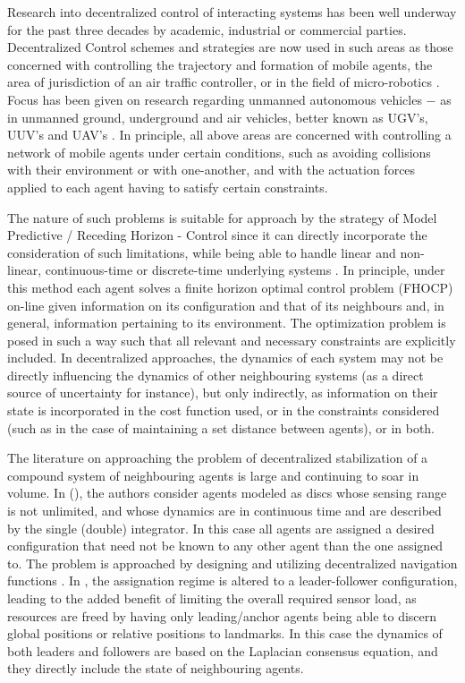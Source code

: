Research into decentralized control of interacting systems has been well
underway for the past three decades by academic, industrial or commercial
parties. Decentralized Control schemes and strategies are now used in such areas
as those concerned with controlling the trajectory and formation of mobile
agents, the area of jurisdiction of an air traffic controller\cite{4459797}, or
in the field of micro-robotics \cite{iswarm}\cite{micron}. Focus has been given
on research regarding unmanned autonomous vehicles $-$ as in unmanned ground,
underground and air vehicles, better known as UGV's, UUV's and
UAV's \cite{1429425}\cite{Dunbar2006549}\cite{4389042}\cite{1470732}.
In principle, all above areas are concerned with controlling a network of
mobile agents under certain conditions, such as avoiding collisions with their
environment or with one-another, and with the actuation forces applied to each
agent having to satisfy certain constraints.

The nature of such problems is suitable for approach by the strategy of
Model Predictive / Receding Horizon - Control since it can directly incorporate
the consideration of such limitations, while being able to handle linear and
non-linear, continuous-time or discrete-time underlying systems
\cite{FINDEISEN2003190}\cite{262032}\cite{grune2016nonlinear}.
In principle, under this method each agent solves a finite horizon optimal
control problem (FHOCP) on-line given information on its configuration and that
of its neighbours and, in general, information pertaining to its environment.
The optimization problem is posed in such a way such that all relevant and
necessary constraints are explicitly included. In decentralized approaches,
the dynamics of each system may not be directly influencing the dynamics of
other neighbouring systems (as a direct source of uncertainty for instance), but
only indirectly, as information on their state is incorporated in the cost
function used, or in the constraints considered (such as in the case of
maintaining a set distance between agents), or in both.

The literature on approaching the problem of decentralized stabilization of a
compound system of neighbouring agents is large and continuing to soar in volume.
In \cite{1470732} (\cite{00207170600867123}), the authors consider agents modeled
as discs whose sensing range is not unlimited, and whose dynamics are in
continuous time and are described by the single (double) integrator. In this case
all agents are assigned a desired configuration that need not be known to
any other agent than the one assigned to. The problem is approached by
designing and utilizing decentralized navigation functions \cite{Lav06}. In
\cite{Gustavi2010133}, the assignation regime is altered to a leader-follower
configuration, leading to the added benefit of limiting the overall required
sensor load, as resources are freed by having only leading/anchor agents
being able to discern global positions or relative positions to landmarks.
In this case the dynamics of both leaders and followers are based on the
Laplacian consensus equation, and they directly include the state of
neighbouring agents.
